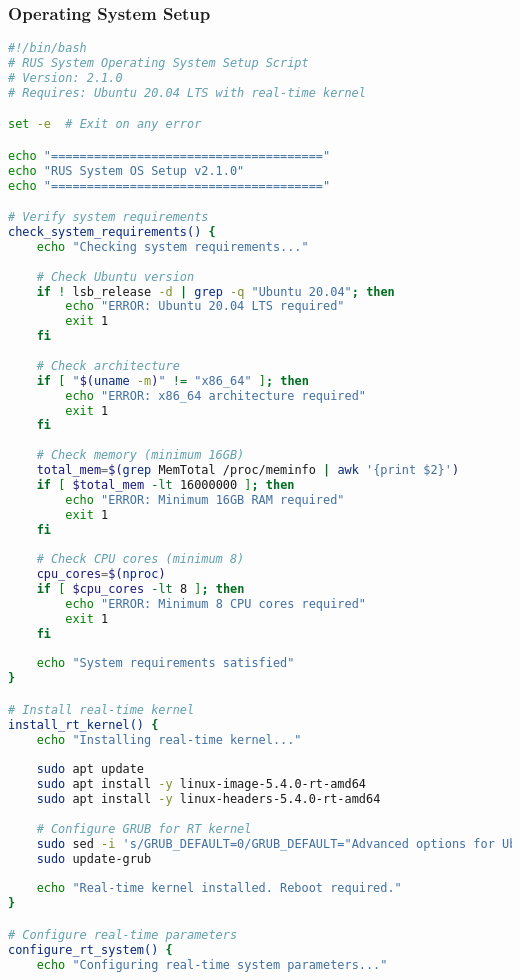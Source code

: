 \subsubsection{Operating System Setup}

\begin{lstlisting}[language=bash, caption={Operating System Installation Script}, label={lst:app-os-setup}]
#!/bin/bash
# RUS System Operating System Setup Script
# Version: 2.1.0
# Requires: Ubuntu 20.04 LTS with real-time kernel

set -e  # Exit on any error

echo "======================================"
echo "RUS System OS Setup v2.1.0"
echo "======================================"

# Verify system requirements
check_system_requirements() {
    echo "Checking system requirements..."
    
    # Check Ubuntu version
    if ! lsb_release -d | grep -q "Ubuntu 20.04"; then
        echo "ERROR: Ubuntu 20.04 LTS required"
        exit 1
    fi
    
    # Check architecture
    if [ "$(uname -m)" != "x86_64" ]; then
        echo "ERROR: x86_64 architecture required"
        exit 1
    fi
    
    # Check memory (minimum 16GB)
    total_mem=$(grep MemTotal /proc/meminfo | awk '{print $2}')
    if [ $total_mem -lt 16000000 ]; then
        echo "ERROR: Minimum 16GB RAM required"
        exit 1
    fi
    
    # Check CPU cores (minimum 8)
    cpu_cores=$(nproc)
    if [ $cpu_cores -lt 8 ]; then
        echo "ERROR: Minimum 8 CPU cores required"
        exit 1
    fi
    
    echo "System requirements satisfied"
}

# Install real-time kernel
install_rt_kernel() {
    echo "Installing real-time kernel..."
    
    sudo apt update
    sudo apt install -y linux-image-5.4.0-rt-amd64
    sudo apt install -y linux-headers-5.4.0-rt-amd64
    
    # Configure GRUB for RT kernel
    sudo sed -i 's/GRUB_DEFAULT=0/GRUB_DEFAULT="Advanced options for Ubuntu>Ubuntu, with Linux 5.4.0-rt-amd64"/' /etc/default/grub
    sudo update-grub
    
    echo "Real-time kernel installed. Reboot required."
}

# Configure real-time parameters
configure_rt_system() {
    echo "Configuring real-time system parameters..."
    

\end{lstlisting}
